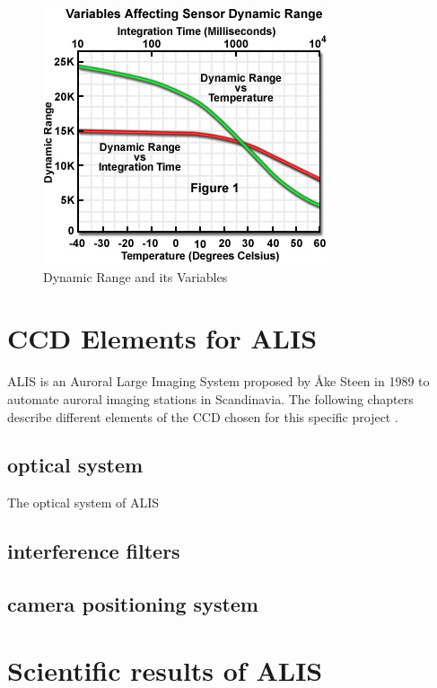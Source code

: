 \begin{figure}[!htbp]
	\centering
	\includegraphics[width=0.6\linewidth]{images/dynrange}
		\caption{Dynamic Range and its Variables\protect\footnotemark}
		 \label{fig:dynrange}
\end{figure}







\section{CCD Elements for ALIS}
ALIS is an Auroral Large Imaging System proposed by Åke Steen in 1989 to automate auroral imaging stations in Scandinavia. The following chapters describe different elements of the CCD chosen for this specific project \citep{brandstrom2003auroral}.

\subsection{optical system}
The optical system of ALIS 

\subsection{interference filters}

\subsection{camera positioning system}


\section{Scientific results of ALIS}


